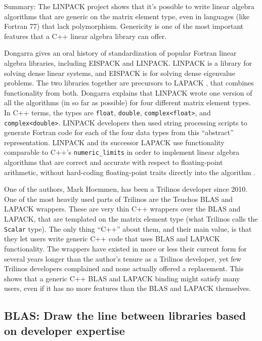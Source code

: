 Summary: The LINPACK project shows that it's possible to write linear
algebra algorithms that are generic on the matrix element type, even
in languages (like Fortran 77) that lack polymorphism.  Genericity is
one of the most important features that a C++ linear algebra library
can offer.

Dongarra gives an oral history \cite{dongarra2005history} of
standardization of popular Fortran linear algebra libraries, including
EISPACK and LINPACK.  LINPACK \cite{dongarra1979linpack} is a library
for solving dense linear systems, and EISPACK \cite{garbow1974eispack}
is for solving dense eigenvalue problems.  The two libraries together
are precursors to LAPACK \cite{anderson1990lapack}, that combines
functionality from both.  Dongarra explains that LINPACK wrote one
version of all the algorithms (in so far as possible) for four
different matrix element types.  In C++ terms, the types are
\texttt{float}, \texttt{double}, \texttt{complex<float>}, and
\texttt{complex<double>}.  LINPACK developers then used string
processing scripts to generate Fortran code for each of the four data
types from this ``abstract'' representation.  LINPACK and its
successor LAPACK use functionality comparable to C++'s
\texttt{numeric\_limits} in order to implement linear algebra
algorithms that are correct and accurate with respect to
floating-point arithmetic, without hard-coding floating-point traits
directly into the algorithm \cite{P1370R0}.

One of the authors, Mark Hoemmen, has been a Trilinos
\cite{heroux2005trilinos} developer since 2010.  One of the most
heavily used parts of Trilinos are the Teuchos BLAS and LAPACK
wrappers.  These are very thin C++ wrappers over the BLAS and LAPACK,
that are templated on the matrix element type (what Trilinos calls the
\texttt{Scalar} type).  The only thing ``C++'' about them, and their
main value, is that they let users write generic C++ code that uses
BLAS and LAPACK functionality.  The wrappers have existed in more or
less their current form for several years longer than the author's
tenure as a Trilinos developer, yet few Trilinos developers complained
and none actually offered a replacement.  This shows that a generic
C++ BLAS and LAPACK binding might satisfy many users, even if it has
no more features than the BLAS and LAPACK themselves.

\subsection{BLAS: Draw the line between libraries
  based on developer expertise}
\label{SS:other-langs:BLAS}

